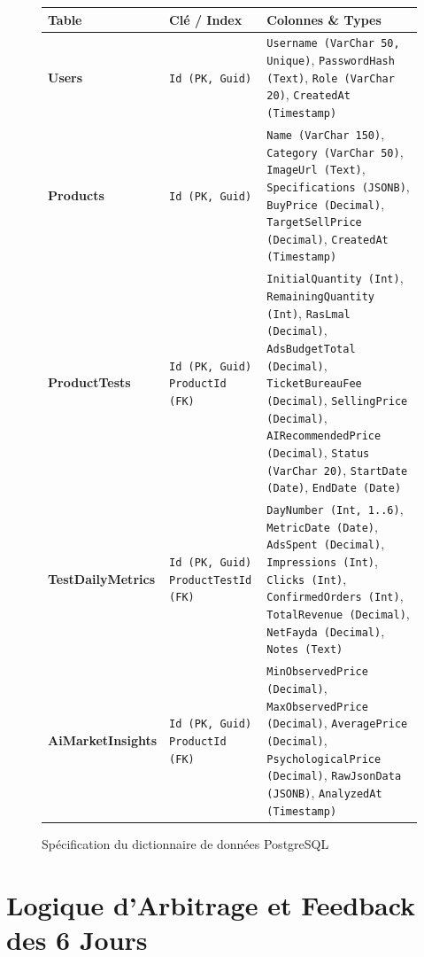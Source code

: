 \documentclass[11pt,a4paper]{article}
\begin{document}
\begin{figure}[h!]
\centering
\small
\begin{tabular}{|p{3.5cm}|p{3.5cm}|p{8cm}|}
\hline
\textbf{Table} & \textbf{Clé / Index} & \textbf{Colonnes \& Types} \\
\hline
\textbf{Users} & \texttt{Id (PK, Guid)} & \texttt{Username (VarChar 50, Unique)}, \texttt{PasswordHash (Text)}, \texttt{Role (VarChar 20)}, \texttt{CreatedAt (Timestamp)} \\
\hline
\textbf{Products} & \texttt{Id (PK, Guid)} & \texttt{Name (VarChar 150)}, \texttt{Category (VarChar 50)}, \texttt{ImageUrl (Text)}, \texttt{Specifications (JSONB)}, \texttt{BuyPrice (Decimal)}, \texttt{TargetSellPrice (Decimal)}, \texttt{CreatedAt (Timestamp)} \\
\hline
\textbf{ProductTests} & \texttt{Id (PK, Guid)} \newline \texttt{ProductId (FK)} & \texttt{InitialQuantity (Int)}, \texttt{RemainingQuantity (Int)}, \texttt{RasLmal (Decimal)}, \texttt{AdsBudgetTotal (Decimal)}, \texttt{TicketBureauFee (Decimal)}, \texttt{SellingPrice (Decimal)}, \texttt{AIRecommendedPrice (Decimal)}, \texttt{Status (VarChar 20)}, \texttt{StartDate (Date)}, \texttt{EndDate (Date)} \\
\hline
\textbf{TestDailyMetrics} & \texttt{Id (PK, Guid)} \newline \texttt{ProductTestId (FK)} & \texttt{DayNumber (Int, 1..6)}, \texttt{MetricDate (Date)}, \texttt{AdsSpent (Decimal)}, \texttt{Impressions (Int)}, \texttt{Clicks (Int)}, \texttt{ConfirmedOrders (Int)}, \texttt{TotalRevenue (Decimal)}, \texttt{NetFayda (Decimal)}, \texttt{Notes (Text)} \\
\hline
\textbf{AiMarketInsights} & \texttt{Id (PK, Guid)} \newline \texttt{ProductId (FK)} & \texttt{MinObservedPrice (Decimal)}, \texttt{MaxObservedPrice (Decimal)}, \texttt{AveragePrice (Decimal)}, \texttt{PsychologicalPrice (Decimal)}, \texttt{RawJsonData (JSONB)}, \texttt{AnalyzedAt (Timestamp)} \\
\hline
\end{tabular}
\caption{Spécification du dictionnaire de données PostgreSQL}
\end{figure}

\section{Logique d'Arbitrage et Feedback des 6 Jours}
\end{document}
